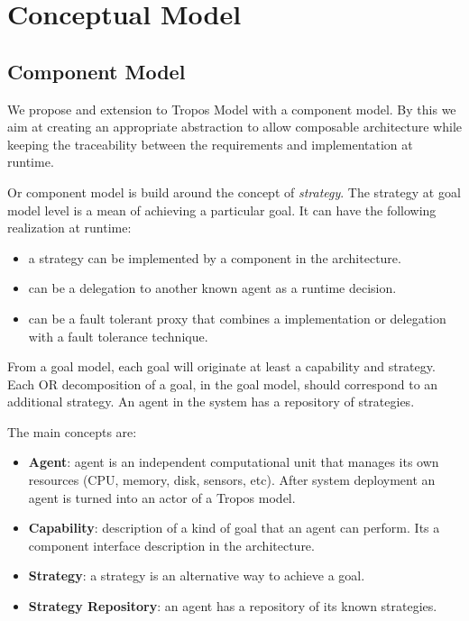 \section{Conceptual Model}
\label{conceptual_model}

\subsection{Component Model}

We propose and extension to Tropos Model with a component model. By this we aim at creating an appropriate abstraction to allow composable architecture while keeping the traceability between the requirements and implementation at runtime.

Or component model is build around the concept of \emph{strategy}. The strategy at goal model level is a mean of achieving a particular goal. It can have the following realization at runtime:

\begin{itemize}
  \item a strategy can be implemented by a component in the architecture.
  \item can be a delegation to another known agent as a runtime decision.
  \item can be a fault tolerant proxy that combines a implementation or delegation with a fault tolerance technique.
\end{itemize}

From a goal model, each goal will originate at least a capability and strategy. Each OR decomposition of a goal, in the goal model, should correspond to an additional strategy.
An agent in the system has a repository of strategies.

The main concepts are:

\begin{itemize}
  \item \textbf{Agent}: agent is an independent computational unit that manages its own resources (CPU, memory, disk, sensors, etc). After system deployment an agent is turned into an actor of a Tropos model.
  \item \textbf{Capability}: description of a kind of goal that an agent can perform. Its a component interface description in the architecture.
  \item \textbf{Strategy}: a strategy is an alternative way to achieve a goal.
  \item \textbf{Strategy Repository}: an agent has a repository of its known strategies.
\end{itemize}

